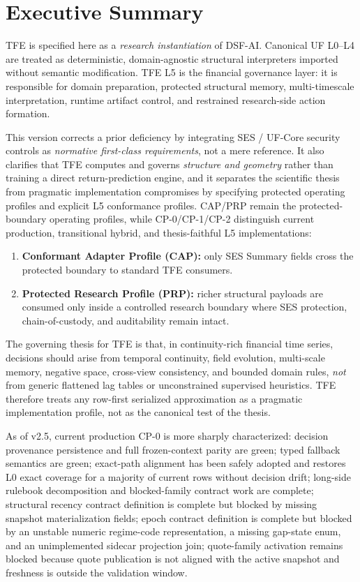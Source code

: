 \chapter*{Executive Summary}
TFE is specified here as a \emph{research instantiation} of DSF-AI. Canonical UF L0--L4 are treated as deterministic, domain-agnostic structural interpreters imported without semantic modification. TFE L5 is the financial governance layer: it is responsible for domain preparation, protected structural memory, multi-timescale interpretation, runtime artifact control, and restrained research-side action formation.

This version corrects a prior deficiency by integrating SES / UF-Core security controls as \emph{normative first-class requirements}, not a mere reference. It also clarifies that TFE computes and governs \emph{structure and geometry} rather than training a direct return-prediction engine, and it separates the scientific thesis from pragmatic implementation compromises by specifying protected operating profiles and explicit L5 conformance profiles. CAP/PRP remain the protected-boundary operating profiles, while CP-0/CP-1/CP-2 distinguish current production, transitional hybrid, and thesis-faithful L5 implementations:
\begin{enumerate}[leftmargin=1.2cm]
    \item \textbf{Conformant Adapter Profile (CAP):} only SES Summary fields cross the protected boundary to standard TFE consumers.
    \item \textbf{Protected Research Profile (PRP):} richer structural payloads are consumed only inside a controlled research boundary where SES protection, chain-of-custody, and auditability remain intact.
\end{enumerate}

The governing thesis for TFE is that, in continuity-rich financial time series, decisions should arise from temporal continuity, field evolution, multi-scale memory, negative space, cross-view consistency, and bounded domain rules, \emph{not} from generic flattened lag tables or unconstrained supervised heuristics. TFE therefore treats any row-first serialized approximation as a pragmatic implementation profile, not as the canonical test of the thesis.

As of v2.5, current production CP-0 is more sharply characterized: decision provenance persistence and full frozen-context parity are green; typed fallback semantics are green; exact-path alignment has been safely adopted and restores L0 exact coverage for a majority of current rows without decision drift; long-side rulebook decomposition and blocked-family contract work are complete; structural recency contract definition is complete but blocked by missing snapshot materialization fields; epoch contract definition is complete but blocked by an unstable numeric regime-code representation, a missing gap-state enum, and an unimplemented sidecar projection join; quote-family activation remains blocked because quote publication is not aligned with the active snapshot and freshness is outside the validation window.

